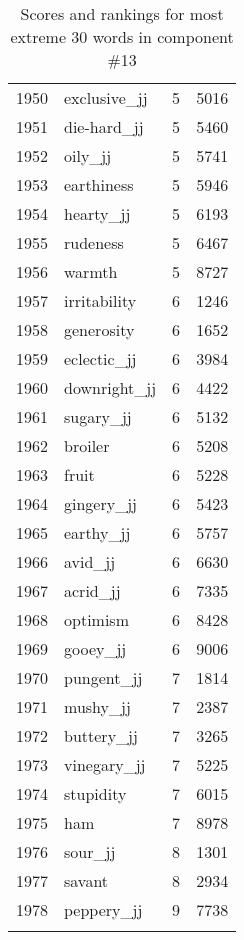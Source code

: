 \begin{longtable}[!htbp]{| rlr@{.}l |}
    1950 & exclusive\_jj & 5 & 5016 \\
    1951 & die-hard\_jj & 5 & 5460 \\
    1952 & oily\_jj & 5 & 5741 \\
    1953 & earthiness & 5 & 5946 \\
    1954 & hearty\_jj & 5 & 6193 \\
    1955 & rudeness & 5 & 6467 \\
    1956 & warmth & 5 & 8727 \\
    1957 & irritability & 6 & 1246 \\
    1958 & generosity & 6 & 1652 \\
    1959 & eclectic\_jj & 6 & 3984 \\
    1960 & downright\_jj & 6 & 4422 \\
    1961 & sugary\_jj & 6 & 5132 \\
    1962 & broiler & 6 & 5208 \\
    1963 & fruit & 6 & 5228 \\
    1964 & gingery\_jj & 6 & 5423 \\
    1965 & earthy\_jj & 6 & 5757 \\
    1966 & avid\_jj & 6 & 6630 \\
    1967 & acrid\_jj & 6 & 7335 \\
    1968 & optimism & 6 & 8428 \\
    1969 & gooey\_jj & 6 & 9006 \\
    1970 & pungent\_jj & 7 & 1814 \\
    1971 & mushy\_jj & 7 & 2387 \\
    1972 & buttery\_jj & 7 & 3265 \\
    1973 & vinegary\_jj & 7 & 5225 \\
    1974 & stupidity & 7 & 6015 \\
    1975 & ham & 7 & 8978 \\
    1976 & sour\_jj & 8 & 1301 \\
    1977 & savant & 8 & 2934 \\
    1978 & peppery\_jj & 9 & 7738 \\
    \hline
    \caption{Scores and rankings for most extreme 30 words in component \#13} \\
\end{longtable}
